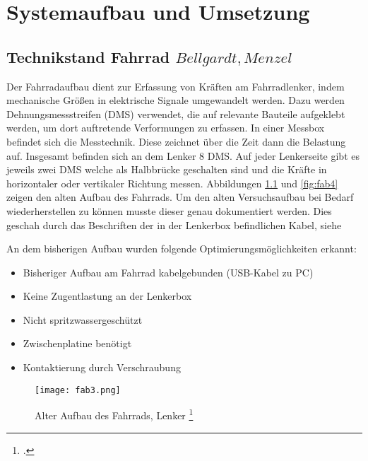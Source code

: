 \chapter{Systemaufbau und Umsetzung}
\label{ch:systemaufbau}
\section{Technikstand Fahrrad \(Bellgardt, Menzel\)}
\label{sec:technikstandfahrrad}
Der Fahrradaufbau dient zur Erfassung von Kräften am Fahrradlenker, indem mechanische Größen in elektrische Signale umgewandelt werden.
Dazu werden Dehnungsmessstreifen (DMS) verwendet, die auf relevante Bauteile aufgeklebt werden, um dort auftretende Verformungen zu erfassen.
In einer Messbox befindet sich die Messtechnik. Diese zeichnet über die Zeit dann die Belastung auf. Insgesamt befinden sich an dem Lenker 8 DMS.
Auf jeder Lenkerseite gibt es jeweils zwei DMS welche als Halbbrücke geschalten sind und die Kräfte in horizontaler oder vertikaler Richtung messen. 
Abbildungen \ref{fig:fab3} und \ref{fig:fab4} zeigen den alten Aufbau des Fahrrads.
Um den alten Versuchsaufbau bei Bedarf wiederherstellen zu können musste dieser genau dokumentiert werden.
Dies geschah durch das Beschriften der in der Lenkerbox befindlichen Kabel, siehe 


An dem bisherigen Aufbau wurden folgende Optimierungsmöglichkeiten erkannt:
\begin{itemize}
    \item Bisheriger Aufbau am Fahrrad kabelgebunden (USB-Kabel zu PC)
    \item Keine Zugentlastung an der Lenkerbox
    \item Nicht spritzwassergeschützt
    \item Zwischenplatine benötigt
    \item Kontaktierung durch Verschraubung
\end{itemize}

\begin{figure}[htbp]
    \begin{center}
        \texttt{[image: fab3.png]}
        \caption[Alter Aufbau des Fahrrads, Lenker (Abbildungsverzeichnis)]{Alter Aufbau des Fahrrads, Lenker
        \footcite{Rechter Teil des Bildes: Praktikum Schwingbruchgefaehrdete Bauteile sicher dimensionieren und betreiben
        }
        }
        \label{fig:fab3}
    \end{center}
\end{figure}


